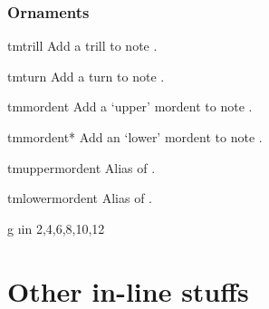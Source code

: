 \documentclass[11pt,a4paper]{ltxdoc}
\begin{document}
\subsubsection{Ornaments}\label{sec:music-notes:misc:ornaments}
\begin{docCommand}{tmtrill}{}
  Add a trill to note .
\end{docCommand}
\begin{docCommand}{tmturn}{}
  Add a turn to note .
\end{docCommand}
\begin{docCommand}{tmmordent}{}
  Add a `upper' mordent to note .
\end{docCommand}
\begin{docCommand}{tmmordent*}{}
  Add an `lower' mordent to note .
\end{docCommand}
\begin{docCommand}{tmuppermordent}{}
  Alias of .
\end{docCommand}
\begin{docCommand}{tmlowermordent}{}
  Alias of .
\end{docCommand}
\begin{dispExample}
\begin{tmsinglestaff}
  \begin{tmstaff}{g}
    \pgfplotsforeachungrouped \i in {2,4,6,8,10,12} {}
  \end{tmstaff}
\end{tmsinglestaff}
\end{dispExample}
\section{Other in-line stuffs}\label{sec:inline}
\end{document}
